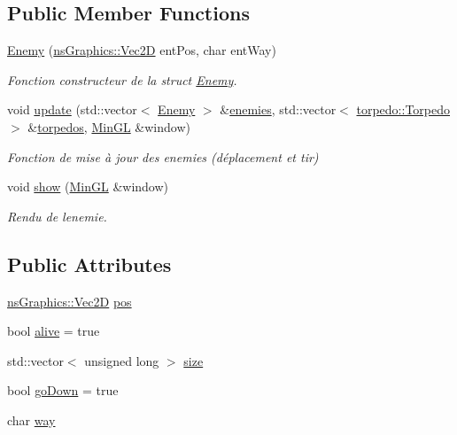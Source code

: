 \subsection*{Public Member Functions}
\begin{DoxyCompactItemize}
\item 
\hyperlink{structenemy_1_1_enemy_aee2b396985788d712cd905a7a827e557}{Enemy} (\hyperlink{classns_graphics_1_1_vec2_d}{ns\+Graphics\+::\+Vec2D} ent\+Pos, char ent\+Way)
\begin{DoxyCompactList}\small\item\em Fonction constructeur de la struct \hyperlink{structenemy_1_1_enemy}{Enemy}. \end{DoxyCompactList}\item 
void \hyperlink{structenemy_1_1_enemy_a56f663147f0dcfc4c6af07027713ba00}{update} (std\+::vector$<$ \hyperlink{structenemy_1_1_enemy}{Enemy} $>$ \&\hyperlink{multi_8cpp_a68dfd8cc6c330a8d7be4cf2f3a6892f3}{enemies}, std\+::vector$<$ \hyperlink{structtorpedo_1_1_torpedo}{torpedo\+::\+Torpedo} $>$ \&\hyperlink{multi_8cpp_a8d978ee3afff71f0b07f921403c2b403}{torpedos}, \hyperlink{class_min_g_l}{Min\+GL} \&window)
\begin{DoxyCompactList}\small\item\em Fonction de mise à jour des enemies (déplacement et tir) \end{DoxyCompactList}\item 
void \hyperlink{structenemy_1_1_enemy_aca9d44d3ae82ec9177f4d50760f0d1cc}{show} (\hyperlink{class_min_g_l}{Min\+GL} \&window)
\begin{DoxyCompactList}\small\item\em Rendu de l\textquotesingle{}enemie. \end{DoxyCompactList}\end{DoxyCompactItemize}
\subsection*{Public Attributes}
\begin{DoxyCompactItemize}
\item 
\hyperlink{classns_graphics_1_1_vec2_d}{ns\+Graphics\+::\+Vec2D} \hyperlink{structenemy_1_1_enemy_a1439cd408ff71d897e2414c062a3dda4}{pos}
\item 
bool \hyperlink{structenemy_1_1_enemy_ac64a666df47674ecf4abeb467991e5cb}{alive} = true
\item 
std\+::vector$<$ unsigned long $>$ \hyperlink{structenemy_1_1_enemy_aa59e1afdd7cba4658530a57b10152686}{size}
\item 
bool \hyperlink{structenemy_1_1_enemy_a03df75f44cf09e588c418e2b49388a9b}{go\+Down} = true
\item 
char \hyperlink{structenemy_1_1_enemy_a6b7b4f12f9ed4a167c1ed0444dda20ba}{way}
\end{DoxyCompactItemize}


